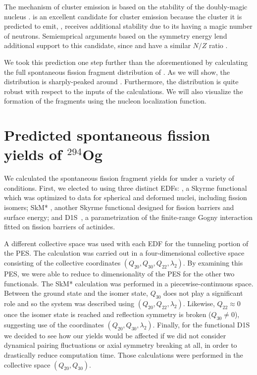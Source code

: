 The mechanism of cluster emission is based on the stability of the doubly-magic nucleus {\Pb}. {\Og} is an excellent candidate for cluster emission because the cluster it is predicted to emit, {\Kr}, receives additional stability due to its having a magic number of neutrons.  Semiemprical arguments based on the symmetry energy lend additional support to this candidate, since {\Og} and {\Pb} have a similar $N/Z$ ratio \cite{Warda2018}.

We took this prediction one step further than the aforementioned by calculating the full spontaneous fission fragment distribution of {\Og}. As we will show, the distribution is sharply-peaked around {\Pb}. Furthermore, the distribution is quite robust with respect to the inputs of the calculations. We will also visualize the formation of the fragments using the nucleon localization function.

\section{Predicted spontaneous fission yields of $^{294}$Og}

We calculated the spontaneous fission fragment yields for {\Og} under a variety of conditions. First, we elected to  using three distinct EDFs: \hfb \cite{Schunck2015}, a Skyrme functional which was optimized to data for spherical and deformed nuclei, including fission isomers; SkM* \cite{Bartel1982}, another Skyrme functional designed for fission barriers and surface energy; and D1S~\cite{Berger1989}, a parametrization of the finite-range Gogny interaction fitted on fission barriers of actinides.

A different collective space was used with each EDF for the tunneling portion of the PES. The {\hfb} calculation was carried out in a four-dimensional collective space consisting of the collective coordinates $(Q_{20}, Q_{30}, Q_{22}, \lambda_2)$. By examining this PES, we were able to reduce to dimensionality of the PES for the other two functionals. The SkM* calculation was performed in a piecewise-continuous space. Between the ground state and the isomer state, $Q_{30}$ does not play a significant role and so the system was described using  $(Q_{20}, Q_{22}, \lambda_2)$. Likewise, $Q_{22} \approx 0$ once the isomer state is reached and reflection symmetry is broken ($Q_{30} \neq 0$), suggesting use of the coordinates  $(Q_{20}, Q_{30}, \lambda_2)$. Finally, for the functional D1S we decided to see how our yields would be affected if we did not consider dynamical pairing fluctuations or axial symmetry breaking at all, in order to drastically reduce computation time. Those calculations were performed in the collective space $(Q_{20}, Q_{30})$.

